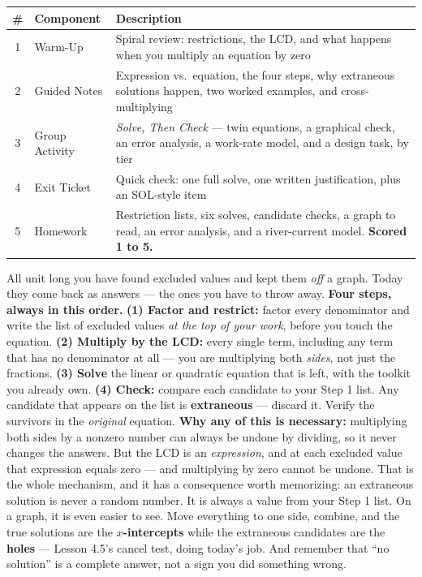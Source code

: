 \documentclass[10pt]{article}
\begin{document}
\begin{tocbox}
\small
\renewcommand{\arraystretch}{1.5}
\begin{tabularx}{\linewidth}{@{} c l X @{}}
\rowcolor{forestbg}
\textbf{\#} & \textbf{Component} & \textbf{Description} \\
\midrule
1 & Warm-Up        & Spiral review: restrictions, the LCD, and what happens when you multiply an equation by zero \\
2 & Guided Notes   & Expression vs.\ equation, the four steps, why extraneous solutions happen, two worked examples, and cross-multiplying \\
3 & Group Activity & \emph{Solve, Then Check} --- twin equations, a graphical check, an error analysis, a work-rate model, and a design task, by tier \\
4 & Exit Ticket    & Quick check: one full solve, one written justification, plus an SOL-style item \\
5 & Homework       & Restriction lists, six solves, candidate checks, a graph to read, an error analysis, and a river-current model. \textbf{Scored 1 to 5.} \\
\end{tabularx}
\end{tocbox}

\vspace{0.10in}

\begin{remindbox}
\small All unit long you have found excluded values and kept them \emph{off} a graph. Today they come
back as answers --- the ones you have to throw away. \textbf{Four steps, always in this order.}
\textbf{(1) Factor and restrict:} factor every denominator and write the list of excluded values
\emph{at the top of your work}, before you touch the equation. \textbf{(2) Multiply by the LCD:} every
single term, including any term that has no denominator at all --- you are multiplying both
\emph{sides}, not just the fractions. \textbf{(3) Solve} the linear or quadratic equation that is left,
with the toolkit you already own. \textbf{(4) Check:} compare each candidate to your Step 1 list. Any
candidate that appears on the list is \textbf{extraneous} --- discard it. Verify the survivors in the
\emph{original} equation. \textbf{Why any of this is necessary:} multiplying both sides by a nonzero
number can always be undone by dividing, so it never changes the answers. But the LCD is an
\emph{expression}, and at each excluded value that expression equals zero --- and multiplying by zero
cannot be undone. That is the whole mechanism, and it has a consequence worth memorizing: an extraneous
solution is never a random number. It is always a value from your Step 1 list. On a graph, it is even
easier to see. Move everything to one side, combine, and the true solutions are the
\textbf{$x$-intercepts} while the extraneous candidates are the \textbf{holes} --- Lesson 4.5's cancel
test, doing today's job. And remember that ``no solution'' is a complete answer, not a sign you did
something wrong.
\end{remindbox}
\end{document}
